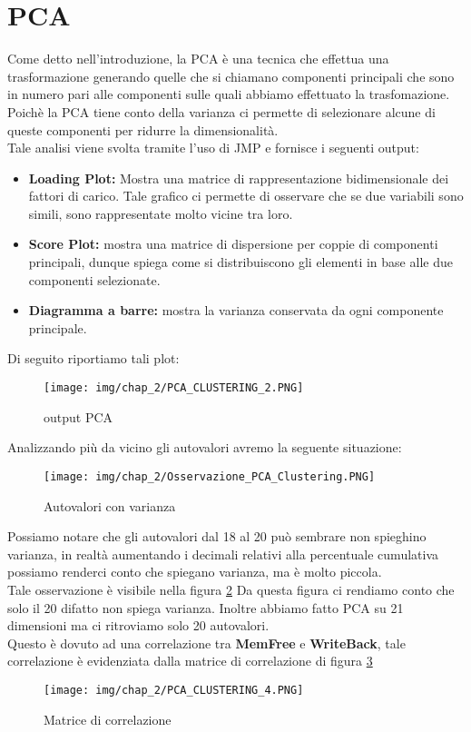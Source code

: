 \section{PCA}
Come detto nell'introduzione, la PCA è una tecnica che effettua una trasformazione generando quelle che si chiamano componenti principali che sono in numero pari alle componenti sulle quali abbiamo effettuato la trasfomazione.\\
Poichè la PCA tiene conto della varianza ci permette di selezionare alcune di queste componenti per ridurre la dimensionalità.\\
Tale analisi viene svolta tramite l'uso di JMP e fornisce i seguenti output: 
\begin{itemize}
    \item \textbf{Loading Plot:} Mostra una matrice  di rappresentazione bidimensionale dei fattori di carico. Tale grafico ci permette di osservare che se due variabili sono simili, sono rappresentate molto vicine tra loro.
    \item \textbf{Score Plot:} mostra una matrice di dispersione per coppie di componenti principali, dunque spiega come si distribuiscono gli elementi in base alle due componenti selezionate.
    \item \textbf{Diagramma a barre:} mostra la varianza conservata da ogni componente principale.
\end{itemize}
Di seguito riportiamo tali plot:\\
\begin{figure}[H]
    \centering
    \texttt{[image: img/chap\_2/PCA\_CLUSTERING\_2.PNG]}
    \caption{output PCA}
    \label{fig:Plot_PCA}
\end{figure}
\noindent
Analizzando più da vicino gli autovalori avremo la seguente situazione:
\begin{figure}[H]
    \centering
    \texttt{[image: img/chap\_2/Osservazione\_PCA\_Clustering.PNG]}
    \caption{Autovalori con varianza}
    \label{fig:Osservazione}
\end{figure}
\noindent
Possiamo notare che gli autovalori dal 18 al 20 può sembrare non spieghino varianza, in realtà aumentando i decimali relativi alla percentuale cumulativa possiamo renderci conto che spiegano varianza, ma è molto piccola.\\
Tale osservazione è visibile nella figura \ref{fig:Osservazione}
Da questa figura ci rendiamo conto che solo il 20 difatto non spiega varianza.
Inoltre abbiamo fatto PCA su 21 dimensioni ma ci ritroviamo solo 20 autovalori.\\
Questo è dovuto ad una correlazione tra \textbf{MemFree} e \textbf{WriteBack}, tale correlazione è evidenziata dalla matrice di correlazione di figura \ref{fig:MatriceDiOsservazione}
\begin{figure}[H]
    \centering
    \texttt{[image: img/chap\_2/PCA\_CLUSTERING\_4.PNG]}
    \caption{Matrice di correlazione}
    \label{fig:MatriceDiOsservazione}
\end{figure}
